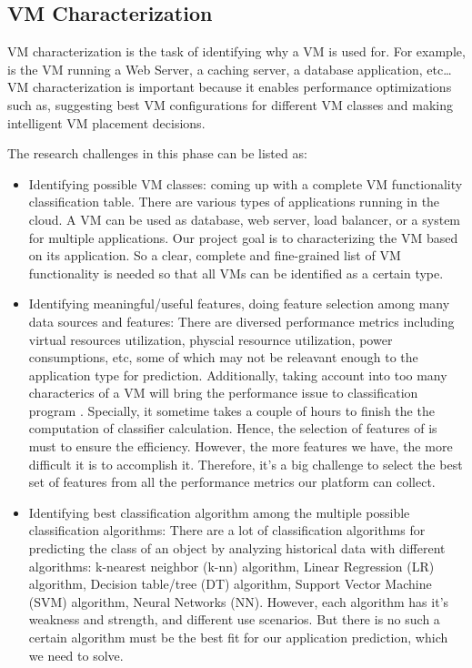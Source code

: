 \subsection{VM Characterization}
VM characterization is the task of identifying why a VM is used for. For example, is the VM running a Web Server, a caching server, a database application, etc… VM characterization is important because it enables performance optimizations such as, suggesting best VM configurations for different VM classes and making intelligent VM placement decisions. 

The research challenges in this phase can be listed as:
\begin{itemize}
\item Identifying possible VM classes: coming up with a complete VM functionality classification table. There are various types of applications running in the cloud. A VM can be used as database, web server, load balancer, or a system for multiple applications. Our project goal is to characterizing the VM based on its application. So a clear, complete and fine-grained list of VM functionality is needed so that all VMs can be identified as a certain type.

\item Identifying meaningful/useful features, doing feature selection among many data sources and features: There are diversed performance metrics including virtual resources utilization, physcial resournce utilization, power consumptions, etc, some of which may not be releavant enough to the application type for prediction. Additionally, taking account into too many characterics of a VM will bring the performance issue to classification program . Specially, it sometime takes a couple of hours to finish the the computation of classifier calculation. Hence, the selection of features of is must to ensure the efficiency. However, the more features we have, the more difficult it is to accomplish it. Therefore, it's a big challenge to select the best set of features from all the performance metrics our platform can collect.

\item Identifying best classification algorithm among the multiple possible classification algorithms: There are a lot of classification algorithms for predicting the class of an object by analyzing historical data with different algorithms: k-nearest neighbor (k-nn) algorithm, Linear Regression (LR) algorithm, Decision table/tree (DT) algorithm, Support Vector Machine (SVM) algorithm, Neural Networks (NN). However, each algorithm has it's weakness and strength, and different use scenarios. But there is no such a certain algorithm must be the best fit for our application prediction, which we need to solve.


\end{itemize}
